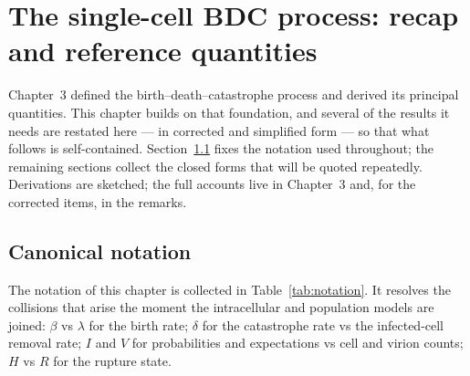 
\section{The single-cell BDC process: recap and reference quantities}

Chapter~3 defined the birth--death--catastrophe process and derived its
principal quantities. This chapter builds on that foundation, and several of
the results it needs are restated here --- in corrected and simplified form ---
so that what follows is self-contained. Section~\ref{sec:notation-tab} fixes
the notation used throughout; the remaining sections collect the closed forms
that will be quoted repeatedly. Derivations are sketched; the full accounts
live in Chapter~3 and, for the corrected items, in the remarks.

\subsection{Canonical notation}
\label{sec:notation-tab}

The notation of this chapter is collected in Table~\ref{tab:notation}. It
resolves the collisions that arise the moment the intracellular and
population models are joined: $\beta$ vs $\lambda$ for the birth rate;
$\delta$ for the catastrophe rate vs the infected-cell removal rate; $I$ and
$V$ for probabilities and expectations vs cell and virion counts; $H$ vs $R$
for the rupture state.

